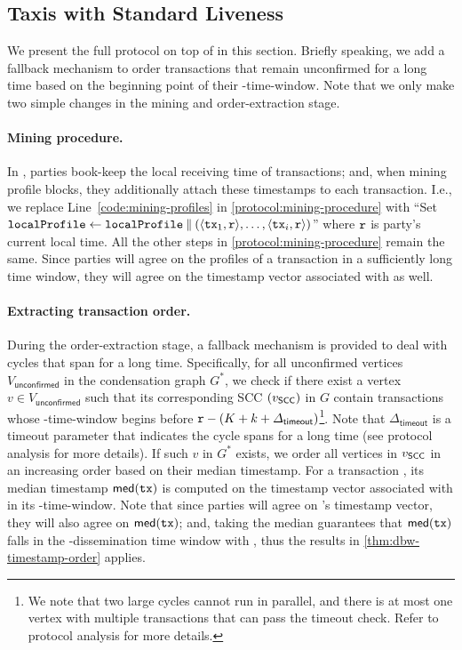 \subsection{Taxis with Standard Liveness}
\label{subsec:taxis-standard-liveness}

We present the full \Taxis protocol on top of \TaxisWL in this section.
%
Briefly speaking, we add a fallback mechanism to order transactions that remain unconfirmed for a long time based on the beginning point of their \PBWindowLen-time-window.
%
Note that we only make two simple changes in the mining and order-extraction stage.

\paragraph{Mining procedure.}
%
In \Taxis, parties book-keep the local receiving time of transactions; and, when mining profile blocks, they additionally attach these timestamps to each transaction.
%
I.e., we replace Line~\ref{code:mining-profiles} in \cref{protocol:mining-procedure} with ``Set $\mathtt{localProfile} \gets \mathtt{localProfile} \mathbin\Vert ( \langle \mathtt{tx}_1, \mathtt{r} \rangle, \ldots, \langle \mathtt{tx}_i, \mathtt{r} \rangle )$'' where $\mathtt{r}$ is party's current local time.
%
All the other steps in \cref{protocol:mining-procedure} remain the same.
%
Since parties will agree on the profiles of a transaction \tx in a sufficiently long time window, they will agree on the timestamp vector associated with \tx as well.



\paragraph{Extracting transaction order.}
%
During the order-extraction stage, a fallback mechanism is provided to deal with cycles that span for a long time.
%
Specifically, for all unconfirmed vertices $V_{\mathsf{unconfirmed}}$ in the condensation graph $G^*$, we check if there exist a vertex $v \in V_{\mathsf{unconfirmed}}$ such that its corresponding SCC $(v_\mathsf{SCC})$ in $G$ contain transactions whose \PBWindowLen-time-window begins before $\mathtt{r} - (K + k + \varDelta_{\mathsf{timeout}})$\footnote{We note that two large cycles cannot run in parallel, and there is at most one vertex with multiple transactions that can pass the timeout check. Refer to protocol analysis for more details.}.
%
Note that $\varDelta_{\mathsf{timeout}}$ is a timeout parameter that indicates the cycle spans for a long time (see protocol analysis for more details).
%
If such $v$ in $G^*$ exists, we order all vertices in $v_\mathsf{SCC}$ in an increasing order based on their median timestamp.
%
For a transaction \tx, its median timestamp $\mathsf{med}(\mathtt{tx})$ is computed on the timestamp vector associated with \tx in its \PBWindowLen-time-window.
%
Note that since parties will agree on \tx's timestamp vector, they will also agree on $\mathsf{med}(\mathtt{tx})$; and, taking the median guarantees that $\mathsf{med}(\mathtt{tx})$ falls in the \txDelay-dissemination time window with \tx, thus the results in \cref{thm:dbw-timestamp-order} applies.


